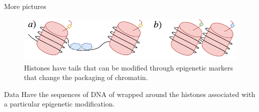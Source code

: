 \documentclass{beamer}
\begin{document}
    \begin{frame}{More pictures}
        \begin{figure}
            \centering
            \includegraphics[width = \textwidth]{OpenCloseChromatinEpi.pdf}
            \caption{Histones have tails that can be modified through epigenetic markers that change the packaging of chromatin.}
            \label{fig:yote}
        \end{figure}
        
        \begin{block}{Data}
        Have the sequences of DNA of wrapped around the histones associated with a particular epigenetic modification.
        \end{block}
    \end{frame}
    
 
        
        
                        
\end{document}
